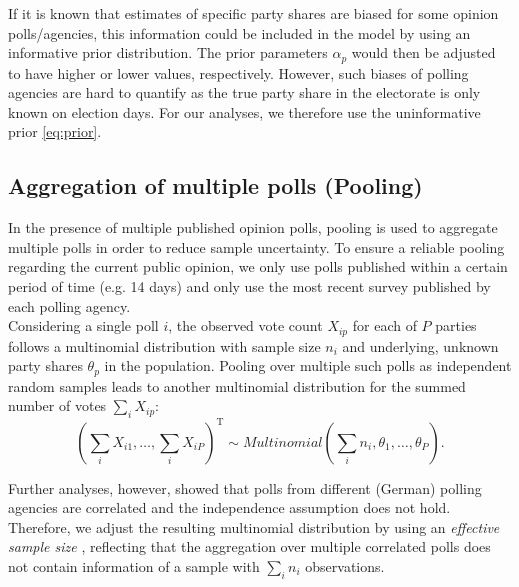 \documentclass[smallcondensed]{svjour3_edited}     %
\newcommand{\T}{\mathrm{\scriptscriptstyle T}}
\begin{document}
If it is known that estimates of specific party shares are biased for some opinion
polls/agencies, this information could be included in the model by using an
informative prior distribution. The prior parameters $\alpha_p$ would then
be adjusted to have higher or lower values, respectively.
However, such biases of polling agencies are hard to quantify as the true party
share in the electorate is only known on election days. For our analyses, we
therefore use the uninformative prior \eqref{eq:prior}.

\subsection{Aggregation of multiple polls (Pooling)} \label{ssec:pooling}
In the presence of multiple published opinion polls, pooling is used to
aggregate multiple polls in order to reduce sample uncertainty. To ensure a
reliable pooling regarding the current public opinion, we only use polls
published within a certain period of time (e.g. 14 days)  and only use the most recent survey published by each polling agency.\\

Considering a single poll $i$, the observed vote count $X_{ip}$ for each of
$P$ parties follows a multinomial distribution with sample size $n_i$ and underlying,
unknown party shares $\theta_p$ in the population.
Pooling over multiple such polls as independent random samples leads to another
multinomial distribution for the summed number of votes $\sum_i X_{ip}$:
\begin{equation}
\left( \sum\limits_i X_{i1},\ldots, \sum\limits_i X_{iP} \right)^\T
  \sim Multinomial \left( \sum\limits_i n_i,\theta_1,\ldots,\theta_P\right).
\end{equation}

Further analyses, however, showed that polls from different (German) polling
agencies are correlated and the independence assumption does not hold. Therefore,
we adjust the resulting multinomial distribution by using an
\textit{effective sample size} \citep{hanley_2003}, reflecting that the aggregation
over multiple correlated polls does not contain information of a sample with
$\sum_i n_i$ observations.\\
\end{document}
